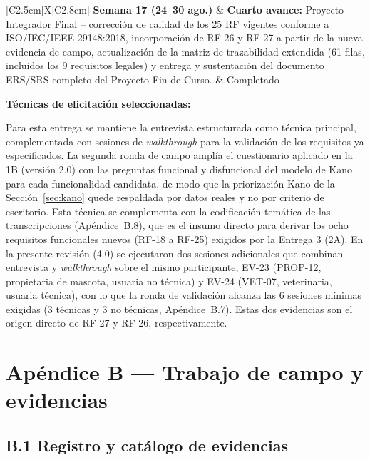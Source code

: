 \documentclass[journal,onecolumn]{IEEEtran}
\begin{document}
\begin{table}[H]
\begin{tabularx}{\linewidth}{|C{2.5cm}|X|C{2.8cm}|}
			\hline
			\textbf{Semana 17 (24--30 ago.)} & \textbf{Cuarto avance:} Proyecto Integrador Final -- corrección de calidad de los 25 RF vigentes conforme a ISO/IEC/IEEE 29148:2018, incorporación de RF-26 y RF-27 a partir de la nueva evidencia de campo, actualización de la matriz de trazabilidad extendida (61 filas, incluidos los 9 requisitos legales) y entrega y sustentación del documento ERS/SRS completo del Proyecto Fin de Curso. & Completado \\
			\hline
		\end{tabularx}
	\end{table}
	
	\textbf{Técnicas de elicitación seleccionadas:}
	
	Para esta entrega se mantiene la entrevista estructurada como técnica
	principal, complementada con sesiones de \emph{walkthrough} para la
	validación de los requisitos ya especificados. La segunda ronda de campo
	amplía el cuestionario aplicado en la 1B (versión 2.0) con las preguntas
	funcional y disfuncional del modelo de Kano para cada funcionalidad candidata,
	de modo que la priorización Kano de la Sección~\ref{sec:kano} quede
	respaldada por datos reales y no por criterio de escritorio. Esta técnica se
	complementa con la codificación temática de las transcripciones
	(Apéndice~B.8), que es el insumo directo para derivar los ocho requisitos
	funcionales nuevos (RF-18 a RF-25) exigidos por la Entrega 3 (2A). En la
	presente revisión (4.0) se ejecutaron dos sesiones adicionales que
	combinan entrevista y \emph{walkthrough} sobre el mismo participante,
	EV-23 (PROP-12, propietaria de mascota, usuaria no técnica) y EV-24
	(VET-07, veterinaria, usuaria técnica), con lo que la ronda de validación
	alcanza las 6 sesiones mínimas exigidas (3 técnicas y 3 no técnicas,
	Apéndice~B.7). Estas dos evidencias son el origen directo de RF-27 y
	RF-26, respectivamente.
	
	\section*{Apéndice B --- Trabajo de campo y evidencias}
	\label{ap:evidencias}
	
	\subsection*{B.1 Registro y catálogo de evidencias}
	
\end{document}
